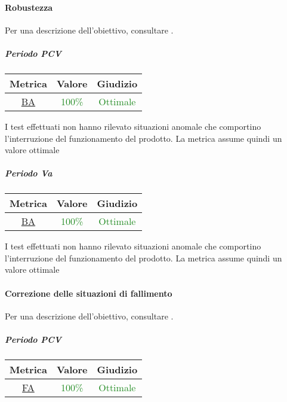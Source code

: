 				\newpage
			\paragraph{Robustezza}
			Per una descrizione dell'obiettivo, consultare .
				\subparagraph{Periodo PCV}
				
				\begin{table}[H]
					\centering
					\begin{tabular}{  c | c | c}
						\hline
						\textbf{Metrica} & \textbf{Valore} & \textbf{Giudizio} \\
						\hline
						\hyperref[MMC]{BA}   & \textcolor{ForestGreen}{100\%}          & \textcolor{ForestGreen}{Ottimale}  \\ \hline
					\end{tabular} 
				\end{table}
			I test effettuati non hanno rilevato situazioni anomale che comportino l'interruzione del funzionamento del prodotto. La metrica assume quindi un valore ottimale
			
			\subparagraph{Periodo Va}
			
			\begin{table}[H]
				\centering
				\begin{tabular}{  c | c | c}
					\hline
					\textbf{Metrica} & \textbf{Valore} & \textbf{Giudizio} \\
					\hline
					\hyperref[MMC]{BA}   & \textcolor{ForestGreen}{100\%}          & \textcolor{ForestGreen}{Ottimale}  \\ \hline
				\end{tabular} 
			\end{table}
			I test effettuati non hanno rilevato situazioni anomale che comportino l'interruzione del funzionamento del prodotto. La metrica assume quindi un valore ottimale
			
			\newpage
			\paragraph{Correzione delle situazioni di fallimento}
			Per una descrizione dell'obiettivo, consultare .
				\subparagraph{Periodo PCV}
				
				\begin{table}[H]
					\centering
					\begin{tabular}{  c | c | c}
						\hline
						\textbf{Metrica} & \textbf{Valore} & \textbf{Giudizio} \\
						\hline
						\hyperref[MMC]{FA}   & \textcolor{ForestGreen}{100\%}          & \textcolor{ForestGreen}{Ottimale}  \\ \hline
					\end{tabular} 
				\end{table}
			

